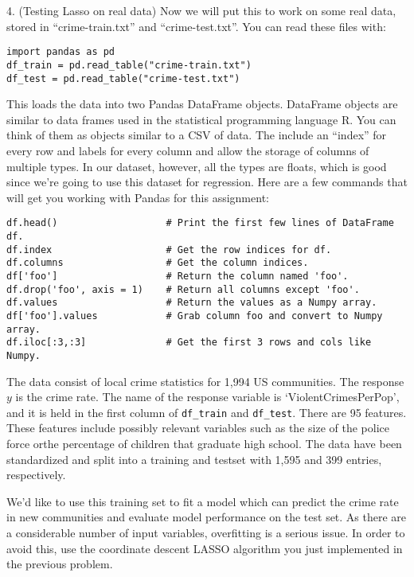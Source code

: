 \documentclass{article}
\begin{document}
4. (Testing Lasso on real data)
Now we will put this to work on some real data, stored in
``crime-train.txt'' and ``crime-test.txt''.
You can read these files with:
\begin{verbatim}
import pandas as pd
df_train = pd.read_table("crime-train.txt")
df_test = pd.read_table("crime-test.txt")
\end{verbatim}
This loads the data into two Pandas DataFrame objects.
DataFrame objects are similar to data frames used in the statistical programming
language R.
You can think of them as objects similar to a CSV of data. 
The include an ``index'' for every row and labels for every column
and allow the storage of columns of multiple types.
In our dataset, however, all the types are floats, which is good since
we're going to use this dataset for regression.
Here are a few commands that will get you working with Pandas for this assignment:
\begin{verbatim}
df.head()                   # Print the first few lines of DataFrame df.
df.index                    # Get the row indices for df.
df.columns                  # Get the column indices.
df['foo']                   # Return the column named 'foo'.
df.drop('foo', axis = 1)    # Return all columns except 'foo'.
df.values                   # Return the values as a Numpy array.
df['foo'].values            # Grab column foo and convert to Numpy array.
df.iloc[:3,:3]              # Get the first 3 rows and cols like Numpy.
\end{verbatim}
The data consist of local crime statistics for 1,994 US communities.
The response $y$ is the crime rate.  
The name of the response variable is `ViolentCrimesPerPop', 
and it is held in the first column of {\tt df\_train} and {\tt df\_test}.
There are 95 features. 
These features include possibly relevant variables such as the 
size of the police force orthe percentage of children that graduate high school.
The data have been standardized and split into a training and testset with 
1,595 and 399 entries, respectively.

\vspace{1em}
We’d like  to  use  this  training  set  to  fit  a  model  which  can  predict  the  crime  rate  in  new  communities  and evaluate model performance on the test set.  
As there are a considerable number of input variables, overfitting is a serious issue.  
In order to avoid this, use the coordinate descent LASSO algorithm 
you just implemented in the previous problem.
\end{document}
